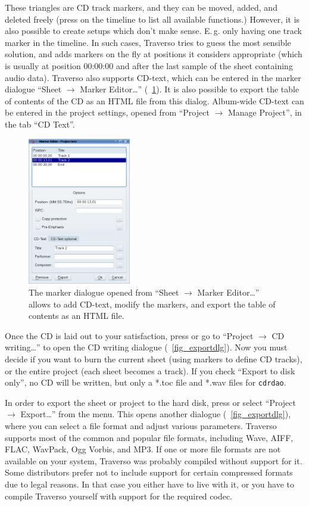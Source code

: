 These triangles are CD track markers, and they can be moved, added, and deleted freely (press  on the timeline to list all available functions.) However, it is also possible to create setups which don't make sense. E.\,g. only having one track marker in the timeline. In such cases, Traverso tries to guess the most sensible solution, and adds markers on the fly at positions it considers appropriate (which is usually at position 00:00:00 and after the last sample of the sheet containing audio data). Traverso also supports CD-text, which can be entered in the marker dialogue ``Sheet $\rightarrow$ Marker Editor\dots'' (\FigB~\ref{fig_marker-editor}). It is also possible to export the table of contents of the CD as an HTML file from this dialog. Album-wide CD-text can be entered in the project settings, opened from ``Project $\rightarrow$ Manage Project'', in the tab ``CD Text''.

\begin{figure}[ht]
 \centering\includegraphics[width=0.4\textwidth]{../images/marker-editor}
 \caption{The marker dialogue opened from ``Sheet $\rightarrow$ Marker Editor\dots'' allows to add CD-text, modify the markers, and export the table of contents as an HTML file.}
 \label{fig_marker-editor}
\end{figure}

Once the CD is laid out to your satisfaction, press  or go to ``Project $\rightarrow$ CD writing\dots'' to open the CD writing dialogue (\FigB~\ref{fig_exportdlg}). Now you must decide if you want to burn the current sheet (using markers to define CD tracks), or the entire project (each sheet becomes a track). If you check ``Export to disk only'', no CD will be written, but only a *.toc file and *.wav files for \texttt{cdrdao}.

In order to export the sheet or project to the hard disk, press  or select ``Project $\rightarrow$ Export\dots'' from the menu. This opens another dialogue (\FigB~\ref{fig_exportdlg}), where you can select a file format and adjust various parameters. Traverso supports most of the common and popular file formats, including Wave, AIFF, FLAC, WavPack, Ogg Vorbis, and MP3. If one or more file formats are not available on your system, Traverso was probably compiled without support for it. Some distributors prefer not to include support for certain compressed formats due to legal reasons. In that case you either have to live with it, or you have to compile Traverso yourself with support for the required codec.

